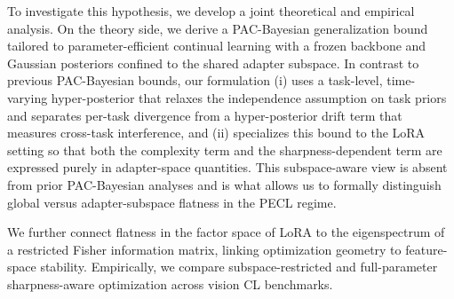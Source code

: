 \documentclass{article}
\theoremstyle{plain}
\theoremstyle{definition}
\theoremstyle{remark}
\begin{document}
To investigate this hypothesis, we develop a joint theoretical and empirical analysis. On the theory side, we derive a PAC-Bayesian generalization bound tailored to parameter-efficient continual learning with a frozen backbone and Gaussian posteriors confined to the shared adapter subspace. In contrast to previous PAC-Bayesian bounds, our formulation (i) uses a task-level, time-varying hyper-posterior that relaxes the independence assumption on task priors and separates per-task divergence from a hyper-posterior drift term that measures cross-task interference, and (ii) specializes this bound to the LoRA setting so that both the complexity term and the sharpness-dependent term are expressed purely in adapter-space quantities. This subspace-aware view is absent from prior PAC-Bayesian analyses and is what allows us to formally distinguish global versus adapter-subspace flatness in the PECL regime.


We further connect flatness in the factor space of LoRA to the eigenspectrum of a restricted Fisher information matrix, linking optimization geometry to feature-space stability. Empirically, we compare subspace-restricted and full-parameter sharpness-aware optimization across vision CL benchmarks. 





\end{document}
